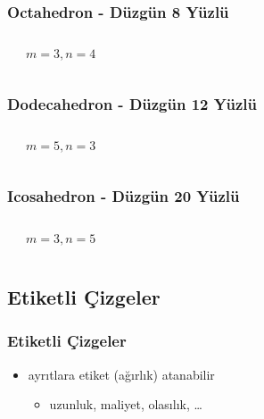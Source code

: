 \documentclass[dvipsnames]{beamer}
\theoremstyle{definition}
\theoremstyle{example}
\theoremstyle{plain}
\begin{document}
\begin{frame}
  \frametitle{Octahedron - Düzgün 8 Yüzlü}

  \begin{columns}
    \begin{center}
    \end{center}

    \begin{center}

      $m=3, n=4$
    \end{center}
  \end{columns}
\end{frame}

\begin{frame}
  \frametitle{Dodecahedron - Düzgün 12 Yüzlü}

  \begin{columns}
    \begin{center}
    \end{center}

    \begin{center}

      $m=5, n=3$
    \end{center}
  \end{columns}
\end{frame}

\begin{frame}
  \frametitle{Icosahedron - Düzgün 20 Yüzlü}

  \begin{columns}
    \begin{center}
    \end{center}

    $m=3, n=5$
  \end{columns}
\end{frame}

\subsection{Etiketli Çizgeler}

\begin{frame}
  \frametitle{Etiketli Çizgeler}

  \begin{itemize}
    \item ayrıtlara etiket (ağırlık) atanabilir
    \begin{itemize}
      \item uzunluk, maliyet, olasılık, \dots
    \end{itemize}
  \end{itemize}
\end{frame}
\end{document}
